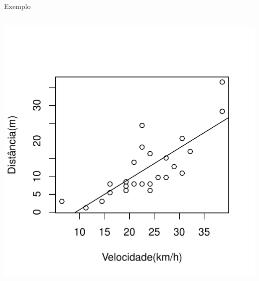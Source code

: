 \documentclass{beamer}\usepackage[]{graphicx}\usepackage[]{color}
\newenvironment{knitrout}{}{} %
\renewenvironment{knitrout}{\setlength{\topsep}{0mm}}{}
\begin{document}
\begin{frame}[fragile]{Exemplo}
\begin{columns}[c]
\begin{knitrout}
\includegraphics[width=.7\linewidth]{figure/v4-2} 

\end{knitrout}

\end{columns}

\end{frame}
\end{document}
